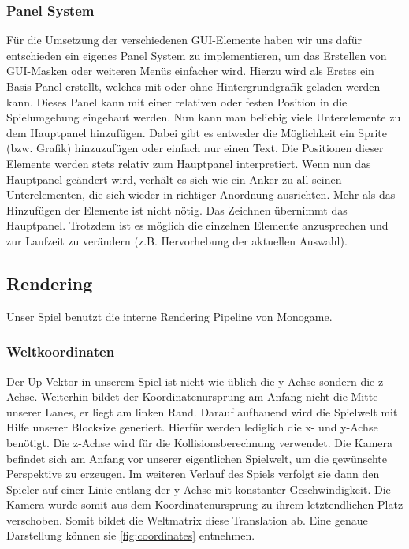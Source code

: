 \documentclass[10pt]{article}
\begin{document}
\vspace{0.5cm}
\subsubsection{Panel System}
Für die Umsetzung der verschiedenen GUI-Elemente haben wir uns dafür entschieden ein eigenes Panel System zu implementieren, um das Erstellen von GUI-Masken oder weiteren Menüs einfacher wird.
Hierzu wird als Erstes ein Basis-Panel erstellt, welches mit oder ohne Hintergrundgrafik geladen werden kann. Dieses Panel kann mit einer relativen oder festen Position in die Spielumgebung eingebaut werden.
Nun kann man beliebig viele Unterelemente zu dem Hauptpanel hinzufügen.
Dabei gibt es entweder die Möglichkeit ein Sprite (bzw. Grafik) hinzuzufügen oder einfach nur einen Text. Die Positionen dieser Elemente werden stets relativ zum Hauptpanel interpretiert. Wenn nun das Hauptpanel geändert wird, verhält es sich wie ein Anker zu all seinen Unterelementen, die sich wieder in richtiger Anordnung ausrichten.
Mehr als das Hinzufügen der Elemente ist nicht nötig. Das Zeichnen übernimmt das Hauptpanel. Trotzdem ist es möglich die einzelnen Elemente anzusprechen und zur Laufzeit zu verändern (z.B. Hervorhebung der aktuellen Auswahl).

\vspace{0.5cm}
\subsection{Rendering}
Unser Spiel benutzt die interne Rendering Pipeline von Monogame.

\vspace{0.5cm}
\subsubsection{Weltkoordinaten}

Der Up-Vektor in unserem Spiel ist nicht wie üblich die y-Achse sondern die z-Achse. Weiterhin bildet der Koordinatenursprung am 
Anfang nicht die Mitte unserer Lanes, er liegt am linken Rand. Darauf aufbauend wird die Spielwelt mit Hilfe unserer Blocksize generiert. Hierfür 
werden lediglich die x- und y-Achse benötigt. Die z-Achse wird für die Kollisionsberechnung verwendet. Die Kamera befindet sich am Anfang 
vor unserer eigentlichen Spielwelt, um die gewünschte Perspektive zu erzeugen. Im weiteren Verlauf des Spiels verfolgt sie dann den Spieler
auf einer Linie entlang der y-Achse mit konstanter Geschwindigkeit. Die Kamera wurde somit aus dem Koordinatenursprung zu ihrem letztendlichen
Platz verschoben. Somit bildet die Weltmatrix diese Translation ab. Eine genaue Darstellung können sie \ref{fig:coordinates} entnehmen.
\end{document}

